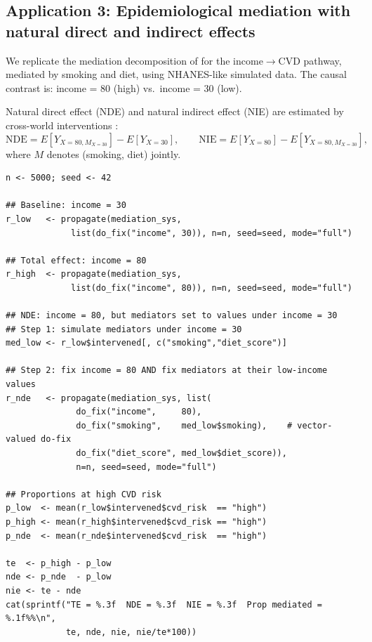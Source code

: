 \documentclass[article]{jss}
\begin{document}
\subsection{Application 3: Epidemiological mediation with natural direct and indirect effects}
\label{sec:app_mediation}

We replicate the mediation decomposition of \citet{vanderweele2015explanation}
for the income$\to$CVD pathway, mediated by smoking and diet, using NHANES-like
simulated data. The causal contrast is: income = 80 (high) vs.\ income = 30 (low).

Natural direct effect (NDE) and natural indirect effect (NIE) are estimated by
cross-world interventions \citep{robins1992identifiability, pearl2001direct}:
\[
  \mathrm{NDE} = E[Y_{X=80, M_{X=30}}] - E[Y_{X=30}], \qquad
  \mathrm{NIE} = E[Y_{X=80}] - E[Y_{X=80, M_{X=30}}],
\]
where $M$ denotes (smoking, diet) jointly.

\begin{tcolorbox}[codebox, title={\small\textbf{R} code --- NDE / NIE}]
\begin{verbatim}
n <- 5000; seed <- 42

## Baseline: income = 30
r_low   <- propagate(mediation_sys,
             list(do_fix("income", 30)), n=n, seed=seed, mode="full")

## Total effect: income = 80
r_high  <- propagate(mediation_sys,
             list(do_fix("income", 80)), n=n, seed=seed, mode="full")

## NDE: income = 80, but mediators set to values under income = 30
## Step 1: simulate mediators under income = 30
med_low <- r_low$intervened[, c("smoking","diet_score")]

## Step 2: fix income = 80 AND fix mediators at their low-income values
r_nde   <- propagate(mediation_sys, list(
              do_fix("income",     80),
              do_fix("smoking",    med_low$smoking),    # vector-valued do-fix
              do_fix("diet_score", med_low$diet_score)),
              n=n, seed=seed, mode="full")

## Proportions at high CVD risk
p_low  <- mean(r_low$intervened$cvd_risk  == "high")
p_high <- mean(r_high$intervened$cvd_risk == "high")
p_nde  <- mean(r_nde$intervened$cvd_risk  == "high")

te  <- p_high - p_low
nde <- p_nde  - p_low
nie <- te - nde
cat(sprintf("TE = %.3f  NDE = %.3f  NIE = %.3f  Prop mediated = %.1f%%\n",
            te, nde, nie, nie/te*100))
\end{verbatim}
\end{tcolorbox}
\end{document}
